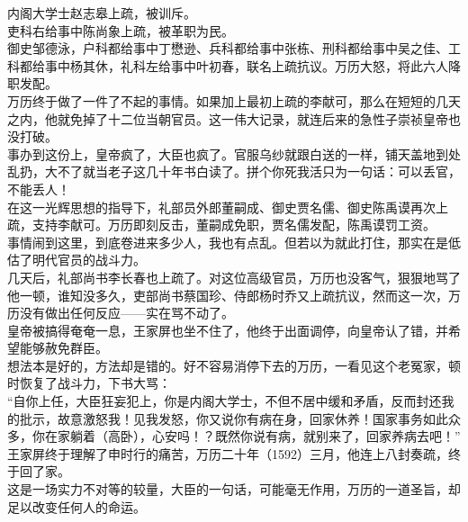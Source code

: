 \begin{multicols}{\theparacolNo}
内阁大学士赵志皋上疏，被训斥。\\

吏科右给事中陈尚象上疏，被革职为民。\\

御史邹德泳，户科都给事中丁懋逊、兵科都给事中张栋、刑科都给事中吴之佳、工科都给事中杨其休，礼科左给事中叶初春，联名上疏抗议。万历大怒，将此六人降职发配。\\

万历终于做了一件了不起的事情。如果加上最初上疏的李献可，那么在短短的几天之内，他就免掉了十二位当朝官员。这一伟大记录，就连后来的急性子崇祯皇帝也没打破。\\

事办到这份上，皇帝疯了，大臣也疯了。官服乌纱就跟白送的一样，铺天盖地到处乱扔，大不了就当老子这几十年书白读了。拼个你死我活只为一句话：可以丢官，不能丢人！\\

在这一光辉思想的指导下，礼部员外郎董嗣成、御史贾名儒、御史陈禹谟再次上疏，支持李献可。万历即刻反击，董嗣成免职，贾名儒发配，陈禹谟罚工资。\\

事情闹到这里，到底卷进来多少人，我也有点乱。但若以为就此打住，那实在是低估了明代官员的战斗力。\\

几天后，礼部尚书李长春也上疏了。对这位高级官员，万历也没客气，狠狠地骂了他一顿，谁知没多久，吏部尚书蔡国珍、侍郎杨时乔又上疏抗议，然而这一次，万历没有做出任何反应——实在骂不动了。\\

皇帝被搞得奄奄一息，王家屏也坐不住了，他终于出面调停，向皇帝认了错，并希望能够赦免群臣。\\

想法本是好的，方法却是错的。好不容易消停下去的万历，一看见这个老冤家，顿时恢复了战斗力，下书大骂：\\

“自你上任，大臣狂妄犯上，你是内阁大学士，不但不居中缓和矛盾，反而封还我的批示，故意激怒我！见我发怒，你又说你有病在身，回家休养！国家事务如此众多，你在家躺着（高卧），心安吗！？既然你说有病，就别来了，回家养病去吧！”\\

王家屏终于理解了申时行的痛苦，万历二十年（1592）三月，他连上八封奏疏，终于回了家。\\

这是一场实力不对等的较量，大臣的一句话，可能毫无作用，万历的一道圣旨，却足以改变任何人的命运。\\


\end{multicols}

